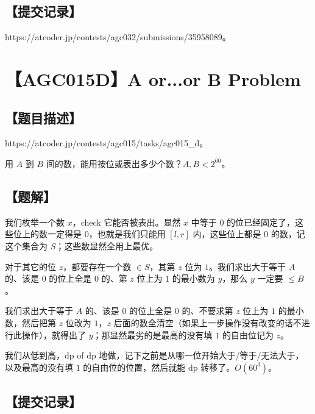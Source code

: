 \documentclass[UTF8,12pt,a4paper]{ctexart}
\begin{document}
	\subsection*{【提交记录】}
	
	https://atcoder.jp/contests/agc032/submissions/35958089。
	
	
	\section*{【AGC015D】A or...or B Problem}
	
	\subsection*{【题目描述】}
	
	https://atcoder.jp/contests/agc015/tasks/agc015\_d。
	
	用 $A$ 到 $B$ 间的数，能用按位或表出多少个数？$A,B< 2^{60}$。
	
	\subsection*{【题解】}
	
	我们枚举一个数 $x$，check 它能否被表出。显然 $x$ 中等于 $0$ 的位已经固定了，这些位上的数一定得是 $0$，也就是我们只能用 $[l,r]$ 内，这些位上都是 $0$ 的数，记这个集合为 $S$；这些数显然全用上最优。
	
	对于其它的位 $z$，都要存在一个数 $\in S$，其第 $z$ 位为 $1$。我们求出大于等于 $A$ 的、该是 $0$ 的位上全是 $0$ 的、第 $z$ 位上为 $1$ 的最小数为 $y$，那么 $y$ 一定要 $\le B$。
	
	我们求出大于等于 $A$ 的、该是 $0$ 的位上全是 $0$ 的、不要求第 $z$ 位上为 $1$ 的最小数，然后把第 $z$ 位改为 $1$，$z$ 后面的数全清空（如果上一步操作没有改变的话不进行此操作），就得出了 $y$；那显然最劣的是最高的没有填 $1$ 的自由位记为 $z$。
	
	我们从低到高，dp of dp 地做，记下之前是从哪一位开始大于/等于/无法大于，以及最高的没有填 $1$ 的自由位的位置，然后就能 dp 转移了。$O(60^3)$。
	
	\subsection*{【提交记录】}
	
\end{document}
